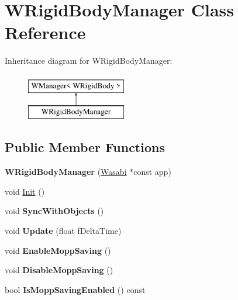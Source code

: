 \hypertarget{class_w_rigid_body_manager}{}\section{W\+Rigid\+Body\+Manager Class Reference}
\label{class_w_rigid_body_manager}
Inheritance diagram for W\+Rigid\+Body\+Manager\+:\begin{figure}[H]
\begin{center}
\leavevmode
\includegraphics[height=2.000000cm]{class_w_rigid_body_manager}
\end{center}
\end{figure}
\subsection*{Public Member Functions}
\begin{DoxyCompactItemize}
\item 
{\bfseries W\+Rigid\+Body\+Manager} (\hyperlink{class_wasabi}{Wasabi} $\ast$const app)\hypertarget{class_w_rigid_body_manager_aaa18b55fffde71797d1b5a8b4a9d0580}{}\label{class_w_rigid_body_manager_aaa18b55fffde71797d1b5a8b4a9d0580}

\item 
void \hyperlink{class_w_rigid_body_manager_a9b50ffc3505be62ab855e6b25cba2049}{Init} ()
\item 
void {\bfseries Sync\+With\+Objects} ()\hypertarget{class_w_rigid_body_manager_ab9465a3211b9dcbec750efff94f97b6e}{}\label{class_w_rigid_body_manager_ab9465a3211b9dcbec750efff94f97b6e}

\item 
void {\bfseries Update} (float f\+Delta\+Time)\hypertarget{class_w_rigid_body_manager_af16a46e4a5b7d522891900258dacd0fa}{}\label{class_w_rigid_body_manager_af16a46e4a5b7d522891900258dacd0fa}

\item 
void {\bfseries Enable\+Mopp\+Saving} ()\hypertarget{class_w_rigid_body_manager_ace882674fb317330ad9e7dfca387ffb9}{}\label{class_w_rigid_body_manager_ace882674fb317330ad9e7dfca387ffb9}

\item 
void {\bfseries Disable\+Mopp\+Saving} ()\hypertarget{class_w_rigid_body_manager_acd442fd20947a5d91ebc15f809de39a2}{}\label{class_w_rigid_body_manager_acd442fd20947a5d91ebc15f809de39a2}

\item 
bool {\bfseries Is\+Mopp\+Saving\+Enabled} () const \hypertarget{class_w_rigid_body_manager_a555cc2fa96763577624bd566c20b5ce5}{}\label{class_w_rigid_body_manager_a555cc2fa96763577624bd566c20b5ce5}

\end{DoxyCompactItemize}
